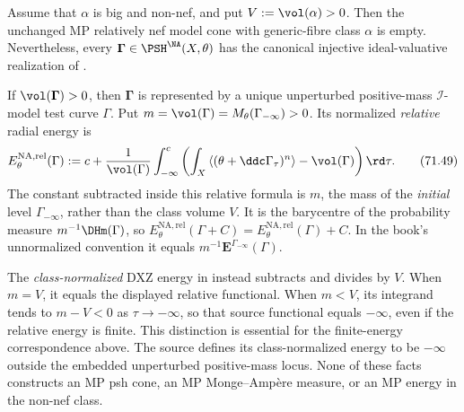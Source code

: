 \begin{proposition}\label{prop:pseff-big-nonnef-surviving-core}
Assume that $\alpha$ is big and non-nef, and put
$V:=\vol(\alpha)>0$.  Then the unchanged MP relatively nef model cone
with generic-fibre class $\alpha$ is empty.  Nevertheless, every
$\boldsymbol\Gamma\in\PSH^{\NA}(X,\theta)$ has the canonical injective
ideal-valuative realization of
.

If $\vol(\boldsymbol\Gamma)>0$, then
$\boldsymbol\Gamma$ is represented by a unique unperturbed
positive-mass $\mathcal I$-model test curve $\Gamma$. Put
$m=\vol(\Gamma)=M_\theta(\Gamma_{-\infty})>0$. Its normalized
\emph{relative} radial energy is
\[
 E_\theta^{\mathrm{NA,rel}}(\Gamma)
 :=c+\frac1{\vol(\Gamma)}\int_{-\infty}^{c}
   \left(
    \int_X\left\langle
       (\theta+\ddc\Gamma_\tau)^n
    \right\rangle-\vol(\Gamma)
   \right)\rd\tau.
\tag{71.49}\label{eq:pseff-big-dxz-energy}
\]
The constant subtracted inside this relative formula is $m$, the mass
of the \emph{initial} level $\Gamma_{-\infty}$, rather than the class
volume $V$. It is the barycentre of the probability measure
$m^{-1}\DHm(\Gamma)$, so
$E_\theta^{\mathrm{NA,rel}}(\Gamma+C)
  =E_\theta^{\mathrm{NA,rel}}(\Gamma)+C$.
In the book's unnormalized convention it equals
$m^{-1}\mathbf E^{\Gamma_{-\infty}}(\Gamma)$.

The \emph{class-normalized} DXZ energy in
\cite[formula~(43)]{DXZ23} instead subtracts and divides by $V$.
When $m=V$, it equals the displayed relative functional. When $m<V$,
its integrand tends to $m-V<0$ as $\tau\to-\infty$, so that source
functional equals $-\infty$, even if the relative energy is finite.
This distinction is essential for the finite-energy correspondence above.
The source defines its class-normalized energy to be $-\infty$ outside
the embedded unperturbed positive-mass locus.  None of these facts constructs
an MP psh cone, an MP Monge--Amp\`ere measure, or an MP energy in the
non-nef class.
\end{proposition}

